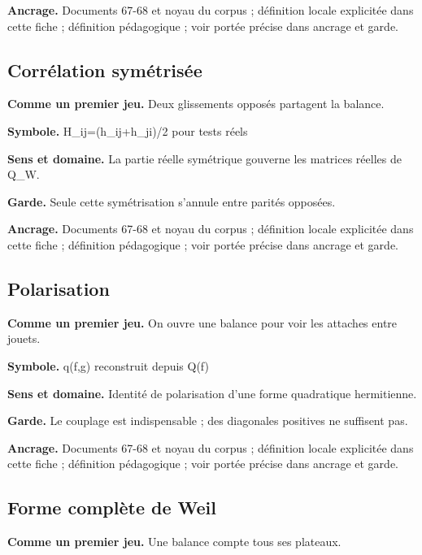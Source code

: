 \documentclass[
  9pt,
  a4paper,
]{article}
\begin{document}
\textbf{Ancrage.} Documents 67-68 et noyau du corpus ; définition locale
explicitée dans cette fiche ; définition pédagogique ; voir portée
précise dans ancrage et garde.

\hypertarget{corruxe9lation-symuxe9trisuxe9e}{%
\subsection{Corrélation
symétrisée}\label{corruxe9lation-symuxe9trisuxe9e}}

\textbf{Comme un premier jeu.} Deux glissements opposés partagent la
balance.

\textbf{Symbole.} H\_ij=(h\_ij+h\_ji)/2 pour tests réels

\textbf{Sens et domaine.} La partie réelle symétrique gouverne les
matrices réelles de Q\_W.

\textbf{Garde.} Seule cette symétrisation s'annule entre parités
opposées.

\textbf{Ancrage.} Documents 67-68 et noyau du corpus ; définition locale
explicitée dans cette fiche ; définition pédagogique ; voir portée
précise dans ancrage et garde.

\hypertarget{polarisation}{%
\subsection{Polarisation}\label{polarisation}}

\textbf{Comme un premier jeu.} On ouvre une balance pour voir les
attaches entre jouets.

\textbf{Symbole.} q(f,g) reconstruit depuis Q(f)

\textbf{Sens et domaine.} Identité de polarisation d'une forme
quadratique hermitienne.

\textbf{Garde.} Le couplage est indispensable ; des diagonales positives
ne suffisent pas.

\textbf{Ancrage.} Documents 67-68 et noyau du corpus ; définition locale
explicitée dans cette fiche ; définition pédagogique ; voir portée
précise dans ancrage et garde.

\hypertarget{forme-compluxe8te-de-weil}{%
\subsection{Forme complète de Weil}\label{forme-compluxe8te-de-weil}}

\textbf{Comme un premier jeu.} Une balance compte tous ses plateaux.
\end{document}
